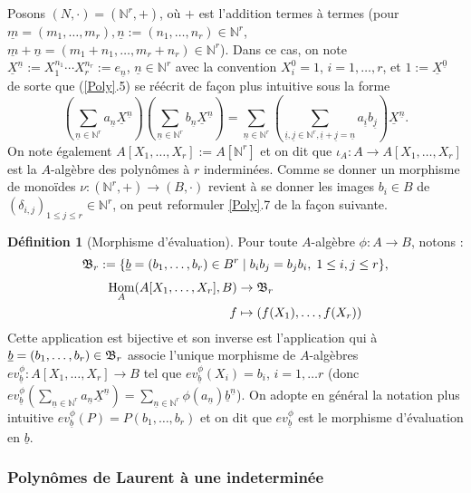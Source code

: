 \documentclass[a4paper, oneside, 12pt]{book}
\theoremstyle{theoremeStyle} %
\theoremstyle{definition} %
\newtheorem{definition}[theoreme]{Définition}
\DeclareMathOperator{\SHom}{Hom}
\newcommand{\N}{\mathbb{N}}
\begin{document}
	Posons $(N,\cdot)=(\N^r,+)$, où $+$ est l'addition termes à termes (pour $\underline{m}=(m_1,\dots,m_r), \underline{n}:=(n_1,\dots, n_r)\in \N^r$,   $\underline{m}+\underline{n}=(m_1+n_1,\dots,m_r+n_r)\in \N^r$). Dans ce cas, on note $\underline{X}^{\underline{n}}:=X_1^{n_1}\cdots X_r^{n_r}:=e_{\underline{n}}$, $\underline{n}\in \N^r$ avec la convention $X_i^0=1$, $i=1,\dots, r$,  et $1:=\underline{X}^{\underline{0}}$ de sorte que (\ref{Poly}.5) se réécrit de façon plus intuitive sous la forme
 $$ (\sum_{\underline{n}\in\N^r}a_{\underline{n}}\underline{X}^{\underline{n}}) (\sum_{\underline{n}\in \N^r}b_{\underline{n}}\underline{X}^{\underline{n}})=\sum_{\underline{n}\in \N^r}(\sum_{\underline{i},\underline{j}\in \N^r, \underline{i}+\underline{j}=\underline{n}}a_{\underline{i}}b_{\underline{j}})\underline{X}^{\underline{n}}.$$
On note également $A[X_1,\dots, X_r]:=A[\N^r]$ et on dit que $\iota_A:A\rightarrow A[X_1,\dots, X_r]$ est la $A$-algèbre des polynômes à $r$ inderminées. Comme se donner un morphisme de monoïdes $\nu:(\N^r,+)\rightarrow (B ,\cdot)$ revient à se donner les images $b_i\in B $ de $(\delta_{i,j})_{1\leq j\leq r}\in \N^r$, on peut reformuler \ref{Poly}.7 de la façon suivante.

\begin{definition}[Morphisme d'évaluation]Pour toute $A$-algèbre $\phi:A\rightarrow B$, notons :
 $$\frak{B}_r:= \lbrace \underline{b}=(b_1,\dots, b_r)\in B^r\;|\; b_ib_j=b_jb_i,\; 1\leq i,j\leq r\rbrace,$$
	\begin{align*} \SHom_A(A[X_1,\dots,X_r],B) &\to \frak{B}_r \\ f &\mapsto (f(X_1),\dots, f(X_r))\end{align*}
Cette application est bijective et son inverse est l'application qui à $\underline{b}=(b_1,\dots, b_r)\in \frak{B}_r$ associe l'unique morphisme de $A$-algèbres $ev_{\underline{b}}^\phi:A[X_1,\dots, X_r]\rightarrow B$ tel que $ev_{\underline{b}}^\phi(X_i)=b_i$, $i=1,\dots r$ (donc $ev_{\underline{b}}^\phi(\sum_{\underline{n}\in \N^r}a_{\underline{n}}\underline{X}^{\underline{n}})=\sum_{\underline{n}\in \N^r}\phi(a_{\underline{n}})\underline{b}^{\underline{n}}$). On adopte  en général la notation plus intuitive $ev_{\underline{b}}^\phi(P)=P(b_1,\dots, b_r)$ et on dit que $ev_{\underline{b}}^\phi$ est le morphisme d'évaluation en $\underline{b}$.\end{definition}

\subsubsection{Polynômes de Laurent à une indeterminée}
\end{document}
